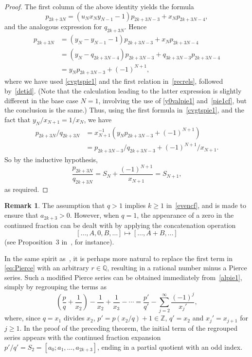 \documentclass[10pt, a4paper]{amsart}
\numberwithin{equation}{section}
\theoremstyle{plain}
\theoremstyle{definition}
\newtheorem{rem}[thm]{Remark}
\newcommand{\Z}{\mathbb{Z}}
\newcommand{\Q}{\mathbb{Q}}
\begin{document}
\begin{proof}
The first column of the above identity yields the formula 
\begin{equation}
\label{pform} 
p_{2k+3N}=(u_N x_N y_{N-1}-1)p_{2k+3N-3} + x_N p_{2k+3N-4} ,
\end{equation} 
and the analogous expression for $q_{2k+3N}$. 
Hence 
\begin{align*}
p_{2k+3N}  
&= (y_N - y_{N-1}-1)p_{2k+3N-3} + x_N p_{2k+3N-4} \\
&= (y_N - q_{2k+3N-4})p_{2k+3N-3} + q_{3k+3N-3} p_{2k+3N-4} \\ 
&= y_N p_{2k+3N-3} + (-1)^{N+1}, 
\end{align*}
where we have used \eqref{cvgtspie1} and the first relation in~\eqref{recrels}, 
followed by~\eqref{detid}. (Note that the calculation leading to the latter 
expression is slightly different in the base case $N=1$, involving 
the use of \eqref{y0valpie1} and~\eqref{pie1cf}, but the 
conclusion is the same.) Thus, using the first formula in~\eqref{cvgtspie1}, 
and the fact that $y_N /x_{N+1}=1/x_N$, we have 
\begin{align*}
{p_{2k+3N}}/{q_{2k+3N}} 
&= x_{N+1}^{-1} \left(y_N p_{2k+3N-3} + (-1)^{N+1}\right) \\
&= {p_{2k+3N-3}}/{q_{2k+3N-3}} + {(-1)^{N+1}}/{x_{N+1}}. 
\end{align*}
So by the inductive hypothesis, 
\[ 
\frac{p_{2k+3N}}{q_{2k+3N}} 
= S_N +  \frac{(-1)^{N+1}}{x_{N+1}} = S_{N+1}, 
\] 
as required.
\end{proof}

\begin{rem} 
 The assumption that $q>1$ implies $k\geq 1$ in~\eqref{evencf}, and is made 
to ensure that $a_{2k+3}>0$. 
However, when $q=1$, the appearance of a zero in the continued fraction 
can be dealt with by applying the concatenation operation 
\begin{equation}
\label{concat} 
[\ldots, A, 0, B, \ldots] \mapsto  [\ldots, A+B, \ldots]
\end{equation} 
(see Proposition~3 in~\cite{folded}, for instance).   
\end{rem}

In the same spirit as~\cite{Hone3}, 
it is perhaps more natural to replace the first term in \eqref{eq:Pierce} with 
an arbitrary $r\in\Q$, resulting in a rational number minus a Pierce series. 
Such a modified Pierce series can be obtained immediately from~\eqref{alpie1}, 
simply by regrouping the terms as 
\begin{equation}
\label{regroup}
\left(\frac{p}{q} + \frac{1}{x_2}\right)-\frac{1}{x_2} 
+ \frac{1}{x_3}-\cdots 
= \frac{p'}{q'}-\sum_{j=2}^\infty \frac{(-1)^j}{x_j'}, 
\end{equation}
where, since $q=x_1$ divides $x_2$,  $p'=p (x_2/q) +1\in\Z$, $q'=x_2$ and $x_j'=x_{j+1}$ 
for $j\geq 1$. In the proof of the preceding theorem, the initial term of the regrouped 
series appears with the continued fraction expansion   
$p'/q'=S_2=[a_0;a_1,\ldots, a_{2k+3}]$, ending in a partial quotient with an odd index. 
\end{document}
